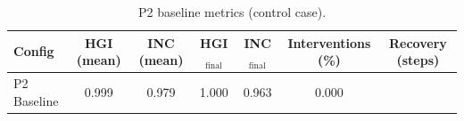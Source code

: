 \begin{table}[H]
\centering
\caption{P2 baseline metrics (control case).}
\label{tab:p2_baseline}
\begin{tabular}{lcccccc}
\toprule
Config & HGI (mean) & INC (mean) & HGI$_{\text{final}}$ & INC$_{\text{final}}$ & Interventions (\%) & Recovery (steps) \\
\midrule
 P2 Baseline & 0.999 & 0.979 & 1.000 & 0.963 & 0.000 &  \\
\bottomrule
\end{tabular}
\end{table}